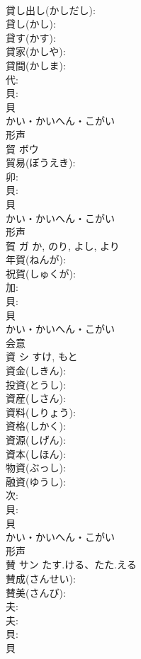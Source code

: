 \documentclass[8pt]{extreport}
\begin{document}
\begin{CJK}{UTF8}{min}
\\	貸し出し(かしだし): 
\\	貸し(かし): 
\\	貸す(かす): 
\\	貸家(かしや): 
\\	貸間(かしま): 
\\	代: 
\\	貝: 
\\	貝	
\\	かい・かいへん・こがい	
\\	形声 
\\	貿	ボウ			
\\	貿易(ぼうえき): 
\\	卯: 
\\	貝: 
\\	貝	
\\	かい・かいへん・こがい	
\\	形声 
\\	賀	ガ		か, のり, よし, より	
\\	年賀(ねんが): 
\\	祝賀(しゅくが): 
\\	加: 
\\	貝: 
\\	貝	
\\	かい・かいへん・こがい	
\\	会意 
\\	資	シ		すけ, もと	
\\	資金(しきん): 
\\	投資(とうし): 
\\	資産(しさん): 
\\	資料(しりょう): 
\\	資格(しかく): 
\\	資源(しげん): 
\\	資本(しほん): 
\\	物資(ぶっし): 
\\	融資(ゆうし): 
\\	次: 
\\	貝: 
\\	貝	
\\	かい・かいへん・こがい	
\\	形声 
\\	賛	サン	たす.ける、たた.える		
\\	賛成(さんせい): 
\\	賛美(さんび): 
\\	夫: 
\\	夫: 
\\	貝: 
\\	貝	

\end{CJK}
\end{document}

